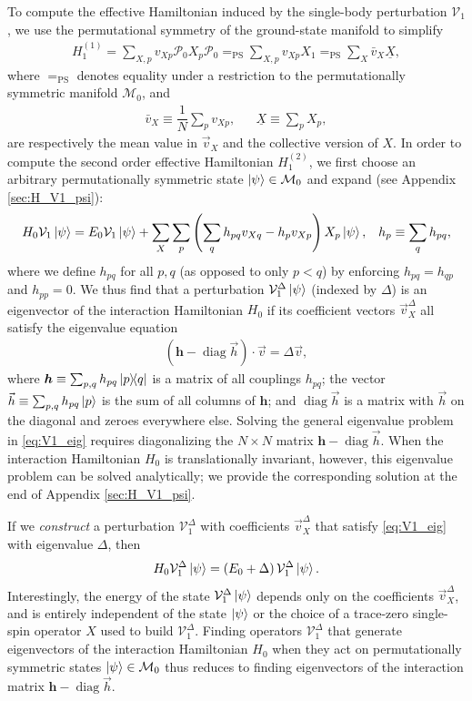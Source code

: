\documentclass[nofootinbib,notitlepage,11pt]{revtex4-2}
\newcommand{\f}[2]{\dfrac{#1}{#2}} %
\newcommand{\p}[1]{\left(#1\right)} %
\renewcommand{\c}{\cdot} %
\newcommand{\m}{\bm} %
\renewcommand{\v}{\vec} %
\newcommand{\1}{\mathds{1}}
\newcommand{\M}{\mathcal{M}}
\renewcommand{\P}{\mathcal{P}}
\newcommand{\V}{\mathcal{V}}
\newcommand{\EQPS}{=_{\text{PS}}}
\newcommand{\col}{\underline}
\DeclareMathOperator{\diag}{diag}
\begin{document}
To compute the effective Hamiltonian induced by the single-body
perturbation $\V_1$, we use the permutational symmetry of the
ground-state manifold to simplify
\begin{align}
  H_1^{(1)} = \sum_{X,p} v_{Xp} \P_0 X_p \P_0
  \EQPS \sum_{X,p} v_{Xp} X_1
  \EQPS \sum_X \bar v_X \col{X},
  \label{eq:H_1_1}
\end{align}
where $\EQPS$ denotes equality under a restriction to the
permutationally symmetric manifold $\M_0$, and
\begin{align}
  \bar v_X \equiv \f1N \sum_p v_{Xp},
  &&
  \col{X} \equiv \sum_p X_p,
\end{align}
are respectively the mean value in $\v v_X$ and the collective version
of $X$.  In order to compute the second order effective Hamiltonian
$H_1^{(2)}$, we first choose an arbitrary permutationally symmetric
state $\ket\psi\in\M_0$ and expand (see Appendix \ref{sec:H_V1_psi}):
\begin{align}
  H_0 \V_1 \ket\psi
  = E_0 \V_1 \ket\psi
  + \sum_X \sum_p \p{\sum_q h_{pq} v_{Xq} - h_p v_{Xp}} X_p
  \ket\psi,
  &&
  h_p \equiv \sum_q h_{pq},
  \label{eq:H_V1_psi}
\end{align}
where we define $h_{pq}$ for all $p,q$ (as opposed to only $p<q$) by
enforcing $h_{pq}=h_{qp}$ and $h_{pp}=0$.  We thus find that a
perturbation $\V_1^\Delta\ket\psi$ (indexed by $\Delta$) is an
eigenvector of the interaction Hamiltonian $H_0$ if its coefficient
vectors $\v v_X^\Delta$ all satisfy the eigenvalue equation
\begin{align}
  \p{\m h - \diag\v h}\c\v v = \Delta \v v,
  \label{eq:V1_eig}
\end{align}
where $\m h\equiv\sum_{p,q}h_{pq}\op{p}{q}$ is a matrix of all
couplings $h_{pq}$; the vector $\v h\equiv\sum_{p,q}h_{pq}\ket{p}$ is
the sum of all columns of $\m h$; and $\diag\v h$ is a matrix with
$\v h$ on the diagonal and zeroes everywhere else.  Solving the
general eigenvalue problem in \eqref{eq:V1_eig} requires diagonalizing
the $N\times N$ matrix $\m h-\diag\v h$.  When the interaction
Hamiltonian $H_0$ is translationally invariant, however, this
eigenvalue problem can be solved analytically; we provide the
corresponding solution at the end of Appendix \ref{sec:H_V1_psi}.

If we {\it construct} a perturbation $\V_1^\Delta$ with coefficients
$\v v_X^\Delta$ that satisfy \eqref{eq:V1_eig} with eigenvalue
$\Delta$, then
\begin{align}
  H_0 \V_1^\Delta \ket\psi = \p{E_0 + \Delta} \V_1^\Delta \ket\psi.
\end{align}
Interestingly, the energy of the state $\V_1^\Delta\ket\psi$ depends
only on the coefficients $\v v_X^\Delta$, and is entirely independent
of the state $\ket\psi$ or the choice of a trace-zero single-spin
operator $X$ used to build $\V_1^\Delta$.  Finding operators
$\V_1^\Delta$ that generate eigenvectors of the interaction
Hamiltonian $H_0$ when they act on permutationally symmetric states
$\ket\psi\in\M_0$ thus reduces to finding eigenvectors of the
interaction matrix $\m h-\diag\v h$.
\end{document}
